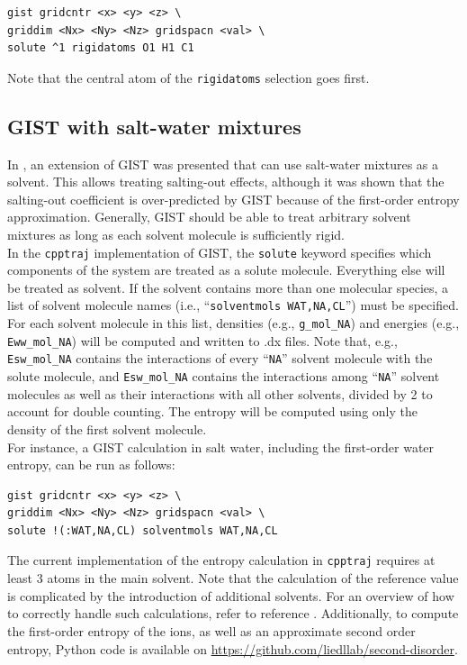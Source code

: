 \documentclass[9pt,tutorial]{livecoms}
\newcommand{\software}{\texttt}
\newcommand\inlinecode{\texttt}
\begin{document}
\begin{lstlisting}[style=cpptraj]
gist gridcntr <x> <y> <z> \
griddim <Nx> <Ny> <Nz> gridspacn <val> \
solute ^1 rigidatoms O1 H1 C1
\end{lstlisting}
Note that the central atom of the \inlinecode{rigidatoms} selection goes first.

\subsection{GIST with salt-water mixtures}
\label{sec-salt-water}
In \cite{Waibl2021-gist-salt}, an extension of GIST was presented that can use salt-water mixtures as a solvent.
This allows treating salting-out effects, although it was shown that the salting-out coefficient is over-predicted by GIST because of the first-order entropy approximation.
Generally, GIST should be able to treat arbitrary solvent mixtures as long as each solvent molecule is sufficiently rigid. \\
In the \software{cpptraj} implementation of GIST, the \inlinecode{solute} keyword specifies which components of the system are treated as a solute molecule.
Everything else will be treated as solvent.
If the solvent contains more than one molecular species, a list of solvent molecule names (i.e., ``\inlinecode{solventmols WAT,NA,CL}'') must be specified.
For each solvent molecule in this list, densities (e.g., \inlinecode{g\_mol\_NA}) and energies (e.g., \inlinecode{Eww\_mol\_NA}) will be computed and written to .dx files.
Note that, e.g., \inlinecode{Esw\_mol\_NA} contains the interactions of every ``\inlinecode{NA}'' solvent molecule with the solute molecule, and \inlinecode{Esw\_mol\_NA} contains the interactions among ``\inlinecode{NA}'' solvent molecules as well as their interactions with all other solvents, divided by 2 to account for double counting.
The entropy will be computed using only the density of the first solvent molecule. \\
For instance, a GIST calculation in salt water, including the first-order water entropy, can be run as follows:

\begin{lstlisting}[style=cpptraj]
gist gridcntr <x> <y> <z> \
griddim <Nx> <Ny> <Nz> gridspacn <val> \
solute !(:WAT,NA,CL) solventmols WAT,NA,CL
\end{lstlisting}
The current implementation of the entropy calculation in \software{cpptraj} requires at least 3 atoms in the main solvent.
Note that the calculation of the reference value is complicated by the introduction of additional solvents.
For an overview of how to correctly handle such calculations, refer to reference \cite{Waibl2021-gist-salt}.
Additionally, to compute the first-order entropy of the ions, as well as an approximate second order entropy, Python code is available on \url{https://github.com/liedllab/second-disorder}.
\end{document}
